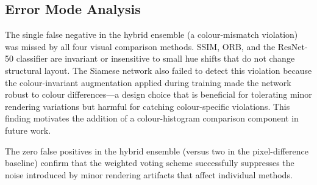 \subsection{Error Mode Analysis}

The single false negative in the hybrid ensemble (a colour-mismatch violation) was
missed by all four visual comparison methods. SSIM, ORB, and the ResNet-50 classifier
are invariant or insensitive to small hue shifts that do not change structural layout.
The Siamese network also failed to detect this violation because the colour-invariant
augmentation applied during training made the network robust to colour differences—a
design choice that is beneficial for tolerating minor rendering variations but harmful
for catching colour-specific violations. This finding motivates the addition of a
colour-histogram comparison component in future work.

The zero false positives in the hybrid ensemble (versus two in the pixel-difference
baseline) confirm that the weighted voting scheme successfully suppresses the noise
introduced by minor rendering artifacts that affect individual methods.
